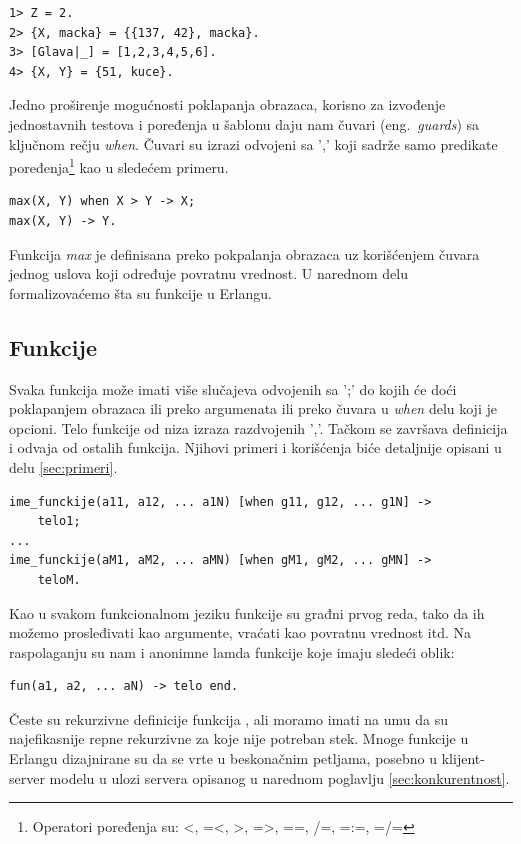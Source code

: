 \documentclass[a4paper]{article}
\begin{document}
{\begin{verbatim}
1> Z = 2.
2> {X, macka} = {{137, 42}, macka}.
3> [Glava|_] = [1,2,3,4,5,6].
4> {X, Y} = {51, kuce}.
\end{verbatim}

Jedno proširenje mogućnosti poklapanja obrazaca, korisno za izvođenje jednostavnih testova i poređenja u šablonu daju nam čuvari (eng.~{\em guards}) sa ključnom rečju {\em when}. Čuvari su izrazi odvojeni sa ',' koji sadrže samo predikate poređenja\footnote{ Operatori poređenja su: <, =<, >, =>, ==, /=, =:=, =/=} kao u sledećem primeru.
\begin{verbatim}
max(X, Y) when X > Y -> X;
max(X, Y) -> Y.
\end{verbatim}
Funkcija {\em max} je definisana preko pokpalanja obrazaca uz korišćenjem čuvara jednog uslova koji određuje povratnu vrednost. U narednom delu formalizovaćemo šta su funkcije u Erlangu.


\subsection{Funkcije}
Svaka funkcija može imati više slučajeva odvojenih sa ';' 
do kojih će doći poklapanjem obrazaca ili preko argumenata ili preko čuvara u {\em when} delu koji je opcioni. 
Telo funkcije od niza izraza razdvojenih ','.
Tačkom se završava definicija i odvaja od ostalih funkcija. 
Njihovi primeri i korišćenja biće detaljnije opisani u delu \ref{sec:primeri}.
\begin{verbatim}
ime_funckije(a11, a12, ... a1N) [when g11, g12, ... g1N] -> 
	telo1;
...
ime_funckije(aM1, aM2, ... aMN) [when gM1, gM2, ... gMN] -> 
	teloM.
\end{verbatim}

Kao u svakom funkcionalnom jeziku funkcije su građni prvog reda, 
tako da ih možemo prosleđivati kao argumente, vraćati kao povratnu vrednost itd. Na raspolaganju su nam i anonimne lamda funkcije koje imaju sledeći oblik:
\begin{verbatim}
fun(a1, a2, ... aN) -> telo end.
\end{verbatim}

Česte su rekurzivne definicije funkcija \cite{book_joe}, 
ali moramo imati na umu da su najefikasnije repne rekurzivne za koje nije potreban stek. 
Mnoge funkcije u Erlangu dizajnirane su da se vrte u beskonačnim petljama, 
posebno u klijent-server modelu u ulozi servera opisanog u narednom poglavlju \ref{sec:konkurentnost}.


}
\end{document}
